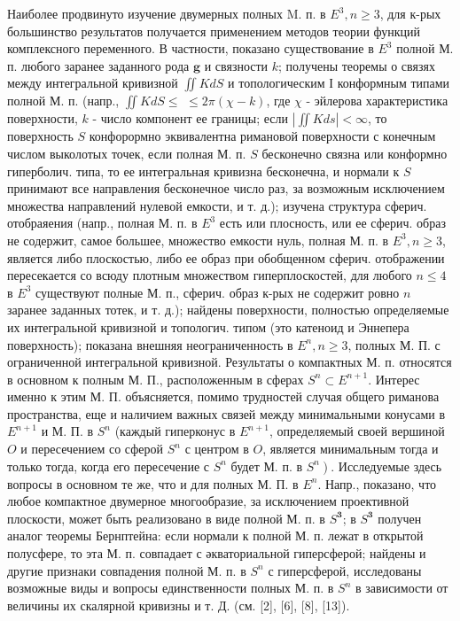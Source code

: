 \documentclass[10pt]{article}
\begin{document}
Наиболее продвинуто изучение двумерных полных M. п. в $E^{3}, n \geqslant 3$, для к-рых большинство результатов получается применением методов теории функций комплексного переменного. В частности, показано существование в $E^{3}$ полной М. п. любого заранее заданного рода $\boldsymbol{g}$ и связности $k$; получены теоремы о связях между интегральной кривизной $\iint K d S$ и топологическим І конформным типами полной М. п. (напр., $\iint K d S \leqslant$ $\leqslant 2 \pi(\chi-k)$, где $\chi$ - эйлерова характеристика поверхности, $k$ - число компонент ее границы; если $\left|\iint K d s\right|<\infty$, то поверхность $S$ конфорормно эквивалентна римановой поверхности с конечным числом выколотых точек, если полная М. п. $S$ бесконечно связна или конформно гиперболич. типа, то ее интегральная кривизна бесконечна, и нормали к $S$ принимают все направления бесконечное число раз, за возможным исключением множества направлений нулевой емкости, и т. д.); изучена структура сферич. отобраяения (напр., полная М. п. в $E^{3}$ есть или плосность, или ее сферич. образ не содержит, самое большее, множество емкости нуль, полная М. п. в $E^{3}, n \geqslant 3$, является либо плоскостью, либо ее образ при обобщенном сферич. отображении пересекается со всюду плотным множеством гиперплоскостей, для любого $n \leqslant 4$ в $E^{3}$ существуют полные М. п., сферич. образ к-рых не содержит ровно $n$ заранее заданных тотек, и т. д.); найдены поверхности, полностью определяемые их интегральной кривизной и топологич. типом (это катеноид и Эннепера поверхность); показана внешняя неограниченность в $E^{n}, n \geqslant 3$, полных М. П. с ограниченной интегральной кривизной. Результаты о компактных М. п. относятся в основном к полным М. П., расположенным в сферах $S^{n} \subset E^{n+1}$. Интерес именно к этим М. П. объясняется, помимо трудностей случая общего риманова пространства, еще и наличием важных связей между минимальными конусами в $E^{n+1}$ и М. П. в $S^{n}$ (каждый гиперконус в $E^{n+1}$, определяемый своей вершиной $O$ и пересечением со сферой $S^{n}$ с центром в $O$, является минимальным тогда и только тогда, когда его пересечение с $S^{n}$ будет М. п. в $\left.S^{n}\right)$. Исследуемые здесь вопросы в основном те же, что и для полных М. П. в $E^{n}$. Напр., показано, что любое компактное двумерное многообразие, за исключением проективной плоскости, может быть реализовано в виде полной М. п. в $S^{\mathbf{3}}$; в $S^{\mathbf{3}}$ получен аналог теоремы Бернптейна: если нормали к полной М. п. лежат в открытой полусфере, то эта М. п. совпадает с әкваториальной гиперсферой; найдены и другие признаки совпадения полной М. п. в $S^{n}$ с гиперсферой, исследованы возможные виды и вопросы единственности полных М. п. в $S^{n}$ в зависимости от величины их скалярной кривизны и т. Д. (см. [2], [6], [8], [13]).
\end{document}
